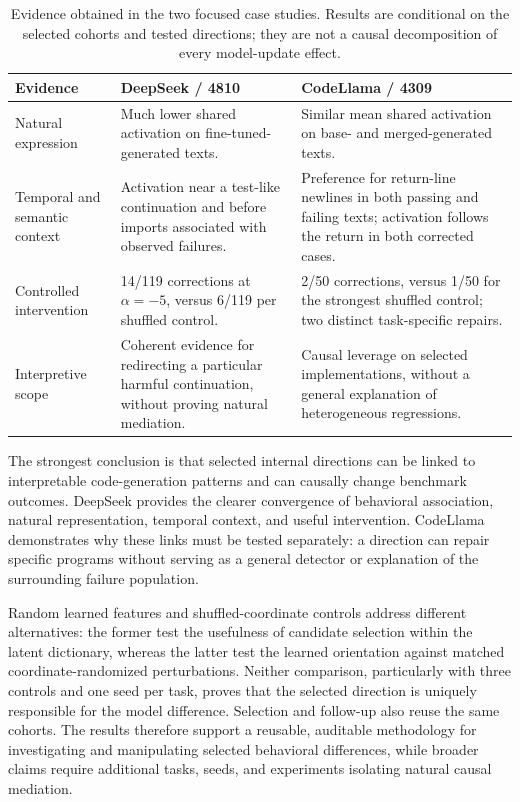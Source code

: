 \begin{table}[t]
\centering\small
\caption{Evidence obtained in the two focused case studies. Results are conditional on the selected cohorts and tested directions; they are not a causal decomposition of every model-update effect.}
\label{tab:case-evidence-summary}
\setlength{\tabcolsep}{4pt}
\begin{tabular}{@{}p{}p{}p{}@{}}
\toprule
Evidence & DeepSeek / 4810 & CodeLlama / 4309 \\
\midrule
Natural expression & Much lower shared activation on fine-tuned-generated texts. & Similar mean shared activation on base- and merged-generated texts. \\
Temporal and semantic context & Activation near a test-like continuation and before imports associated with observed failures. & Preference for return-line newlines in both passing and failing texts; activation follows the return in both corrected cases. \\
Controlled intervention & 14/119 corrections at $\alpha=-5$, versus 6/119 per shuffled control. & 2/50 corrections, versus 1/50 for the strongest shuffled control; two distinct task-specific repairs. \\
Interpretive scope & Coherent evidence for redirecting a particular harmful continuation, without proving natural mediation. & Causal leverage on selected implementations, without a general explanation of heterogeneous regressions. \\
\bottomrule
\end{tabular}
\end{table}

The strongest conclusion is that selected internal directions can be linked to interpretable code-generation patterns and can causally change benchmark outcomes. DeepSeek provides the clearer convergence of behavioral association, natural representation, temporal context, and useful intervention. CodeLlama demonstrates why these links must be tested separately: a direction can repair specific programs without serving as a general detector or explanation of the surrounding failure population.

Random learned features and shuffled-coordinate controls address different alternatives: the former test the usefulness of candidate selection within the latent dictionary, whereas the latter test the learned orientation against matched coordinate-randomized perturbations. Neither comparison, particularly with three controls and one seed per task, proves that the selected direction is uniquely responsible for the model difference. Selection and follow-up also reuse the same cohorts. The results therefore support a reusable, auditable methodology for investigating and manipulating selected behavioral differences, while broader claims require additional tasks, seeds, and experiments isolating natural causal mediation.
